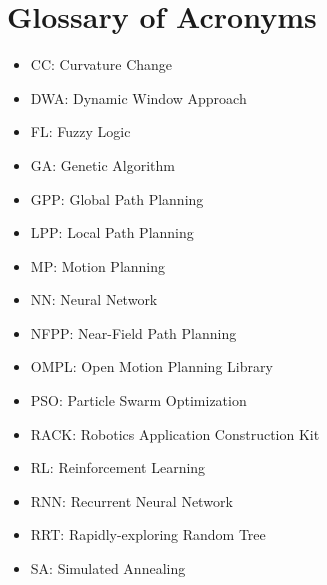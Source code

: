 \chapter*{Glossary of Acronyms}


\begin{itemize}
        \item CC: Curvature Change
        \item DWA: Dynamic Window Approach
        \item FL: Fuzzy Logic
        \item GA: Genetic Algorithm
        \item GPP: Global Path Planning
        \item LPP: Local Path Planning
        \item MP: Motion Planning
        \item NN: Neural Network
        \item NFPP: Near-Field Path Planning
        \item OMPL: Open Motion Planning Library
        \item PSO: Particle Swarm Optimization
        \item RACK: Robotics Application Construction Kit
        \item RL: Reinforcement Learning
        \item RNN: Recurrent Neural Network
        \item RRT: Rapidly-exploring Random Tree
        \item SA: Simulated Annealing
\end{itemize}

\newpage








